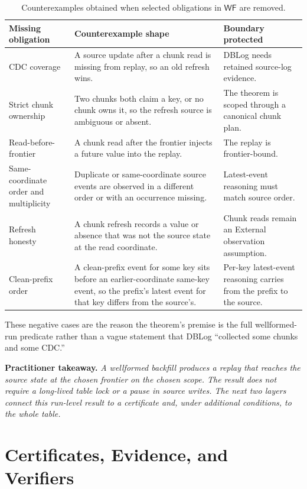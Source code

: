 \documentclass[letterpaper,10pt,twocolumn]{article}
\newcommand{\WF}{\mathsf{WF}}
\begin{document}
\begin{table}[t]
\caption{Counterexamples obtained when selected obligations in $\WF$
are removed.}
\label{tab:load-bearing-obligations}
\centering\small
\begin{tabularx}{\textwidth}{@{}p{1.4in}YY@{}}
\toprule
\textbf{Missing obligation} & \textbf{Counterexample shape} &
\textbf{Boundary protected}\\
\midrule
CDC coverage &
  A source update after a chunk read is missing from replay, so an old
  refresh wins. &
  DBLog needs retained source-log evidence.\\
Strict chunk ownership &
  Two chunks both claim a key, or no chunk owns it, so the refresh
  source is ambiguous or absent. &
  The theorem is scoped through a canonical chunk plan.\\
Read-before-frontier &
  A chunk read after the frontier injects a future value into the
  replay. &
  The replay is frontier-bound.\\
Same-coordinate order and multiplicity &
  Duplicate or same-coordinate source events are observed in a
  different order or with an occurrence missing. &
  Latest-event reasoning must match source order.\\
Refresh honesty &
  A chunk refresh records a value or absence that was not the source
  state at the read coordinate. &
  Chunk reads remain an External observation assumption.\\
Clean-prefix order &
  A clean-prefix event for some key sits before an earlier-coordinate
  same-key event, so the prefix's latest event for that key differs
  from the source's. &
  Per-key latest-event reasoning carries from the prefix to the
  source.\\
\bottomrule
\end{tabularx}
\end{table}

These negative cases are the reason the theorem's
premise is the full wellformed-run predicate rather than a vague
statement that DBLog ``collected some chunks and some CDC.''

\smallskip
\noindent\textbf{Practitioner takeaway.} \emph{A wellformed backfill
produces a replay that reaches the source state at the chosen frontier
on the chosen scope. The result does not require a long-lived table lock
or a pause in source writes. The next two layers connect this run-level
result to a certificate and, under additional conditions, to the whole
table.}

\section{Certificates, Evidence, and
Verifiers}\label{certificates-evidence-and-verifiers}
\end{document}
